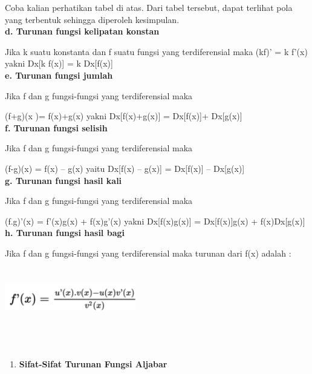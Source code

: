 \documentclass[11pt,fleqn]{book} %
\begin{document}
\noindent 
Coba kalian perhatikan tabel di atas. Dari tabel tersebut, dapat terlihat pola yang terbentuk sehingga diperoleh kesimpulan.\\

\noindent 
\noindent \textbf{d. Turunan fungsi kelipatan konstan}

\noindent 
Jika  k  suatu konstanta dan  f  suatu fungsi yang terdiferensial maka 
\noindent 
(kf)' = k f'(x)  yakni  Dx[k f(x)]  =  k Dx[f(x)]\\

\noindent 
\noindent \textbf{e. Turunan fungsi jumlah}

\noindent 
Jika  f  dan  g  fungsi-fungsi yang terdiferensial maka 

\noindent 
(f+g)(x )= f(x)+g(x)  yakni  Dx[f(x)+g(x)] = Dx[f(x)]+ Dx[g(x)]\\

\noindent 
\noindent \textbf{f. Turunan fungsi selisih}

\noindent 
Jika  f  dan  g  fungsi-fungsi yang terdiferensial maka

\noindent 
(f-g)(x) = f(x) – g(x)   yaitu  Dx[f(x) – g(x)] = Dx[f(x)] – Dx[g(x)]\\

\noindent 
\noindent \textbf{g. Turunan fungsi hasil kali}

\noindent 
Jika f dan g fungsi-fungsi yang terdiferensial maka 

\noindent 
(f.g)'(x) = f'(x)g(x) + f(x)g'(x)  yakni  Dx[f(x)g(x)] = Dx[f(x)]g(x) + f(x)Dx[g(x)]\\

\noindent 
\noindent \textbf{h. Turunan fungsi hasil bagi}

\noindent 
Jika f dan g fungsi-fungsi yang terdiferensial maka turunan dari f(x) adalah :
\noindent 

\noindent 
\begin{center}
\includegraphics*[width=2.25in, height=1.01in]{Pictures/TurunanFungsi12.png}
\end{center}

\noindent 
 \\
 
\noindent
\begin{enumerate}
\item \textbf{Sifat-Sifat Turunan Fungsi Aljabar }
\end{enumerate}
\end{document}
